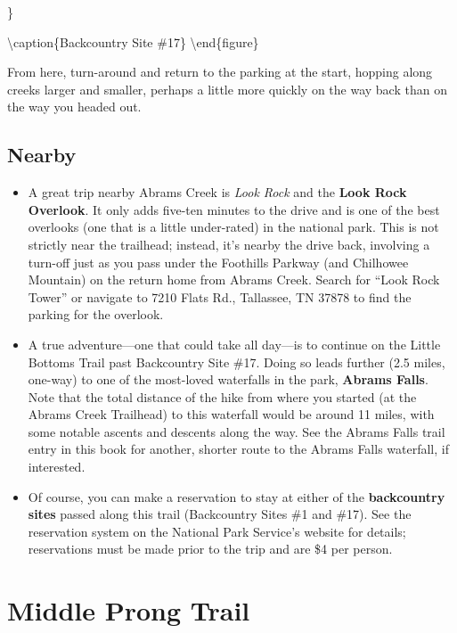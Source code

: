 \documentclass[
]{book}
\begin{document}
\}

\textbackslash caption\{Backcountry Site \#17\}\label{fig:unnamed-chunk-47}
\textbackslash end\{figure\}

From here, turn-around and return to the parking at the start, hopping along
creeks larger and smaller, perhaps a little more quickly on the way back than on
the way you headed out.

\hypertarget{nearby-13}{%
\section{Nearby}\label{nearby-13}}

\begin{itemize}
\item
  A great trip nearby Abrams Creek is \emph{Look Rock} and the \textbf{Look Rock Overlook}.
  It only adds five-ten minutes to the drive and is one of the best overlooks
  (one that is a little under-rated) in the national park. This is not strictly
  near the trailhead; instead, it's nearby the drive back, involving a turn-off
  just as you pass under the Foothills Parkway (and Chilhowee Mountain) on the
  return home from Abrams Creek. Search for ``Look Rock Tower'' or navigate to 7210
  Flats Rd., Tallassee, TN 37878 to find the parking for the overlook.
\item
  A true adventure---one that could take all day---is to continue on the Little
  Bottoms Trail past Backcountry Site \#17. Doing so leads further (2.5
  miles, one-way) to one of the most-loved waterfalls in the park, \textbf{Abrams Falls}.
  Note that the total distance of the hike from where you started (at the Abrams
  Creek Trailhead) to this waterfall would be around 11 miles, with some notable
  ascents and descents along the way. See the Abrams Falls trail entry in this
  book for another, shorter route to the Abrams Falls waterfall, if interested.
\item
  Of course, you can make a reservation to stay at either of the \textbf{backcountry
  sites} passed along this trail (Backcountry Sites \#1 and \#17). See the
  reservation system on the National Park Service's website for details;
  reservations must be made prior to the trip and are \$4 per person.
\end{itemize}

\hypertarget{middle-prong-trail}{%
\chapter{Middle Prong Trail}\label{middle-prong-trail}}
\end{document}

